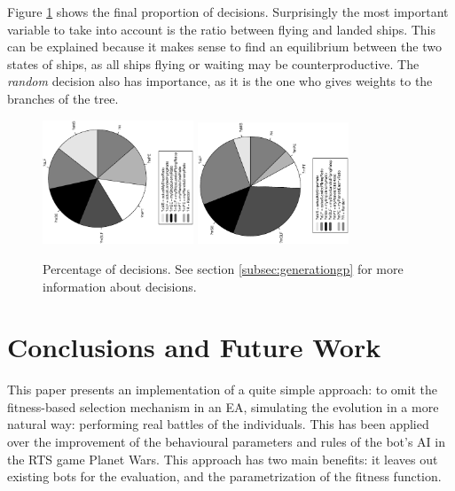 \documentclass[conference]{IEEEtran}
\begin{document}
Figure \ref{figura:tarta_decissions} shows the final proportion of decisions. Surprisingly the most important variable to take into account is the ratio between flying and landed ships. This can be explained because it makes sense to find an equilibrium between the two states of ships, as all ships flying or waiting may be counterproductive. The {\em random} decision also has importance, as it is the one who gives weights to the branches of the tree.
\begin{figure}[htb]
\tiny
\begin{center}


    \includegraphics[trim=1cm 5.5cm 0cm 5.5cm, clip=true,width=4.5cm,angle=-90]{./imags/distribution_initial_condition.eps}
    \includegraphics[trim=1cm 5.5cm 0cm 5.5cm, clip=true,width=4.5cm,angle=-90]{./imags/distribution_final_condition.eps}



\end{center}
\caption{Percentage of decisions. See section \ref{subsec:generationgp} for more information about decisions.}
\label{figura:tarta_decissions}
\end{figure}




%
\section{Conclusions and Future Work}
\label{sec:conclusions}

This paper presents an implementation of a quite simple approach: to omit the fitness-based selection mechanism in an EA, simulating the evolution in a more natural way: performing real battles of the individuals. This has been applied over the improvement of the behavioural parameters and rules of the bot's AI in the RTS game Planet Wars. This approach has two main benefits: it leaves out existing bots for the evaluation, and the parametrization of the fitness function.
\end{document}
